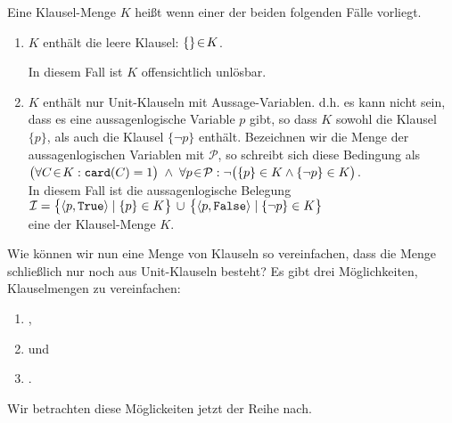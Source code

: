 \begin{Definition}
  Eine Klausel-Menge $K$ heißt  wenn einer der beiden folgenden Fälle
  vorliegt.
  \begin{enumerate}
  \item $K$ enthält die leere Klausel: \qquad $\{\} \!\in\! K$.

        In diesem Fall ist $K$ offensichtlich unlösbar.
  \item $K$ enthält nur Unit-Klauseln mit \underline{} Aussage-Variablen. d.h. es kann nicht
        sein, dass es eine aussagenlogische Variable $p$ gibt, so dass $K$ sowohl die Klausel $\{p\}$, als auch die
        Klausel $\{\neg p \}$ enthält.  Bezeichnen wir die Menge der aussagenlogischen Variablen mit $\mathcal{P}$,
        so schreibt sich diese Bedingung als 
        \\[0.3cm]
        \hspace*{1.3cm}
        $\bigl(\forall C \!\in\! K: \texttt{card}(C) = 1\bigr) \;\wedge\;
         \forall p \!\in\! \mathcal{P}: \neg\bigl( \{p\} \in K \wedge \{\neg p\} \in K\bigr)$.
        \\[0.3cm]
        In diesem Fall ist die aussagenlogische Belegung
        \\[0.2cm]
        \hspace*{1.3cm}
        $ \I = \bigl\{ \pair(p, \texttt{True}) \mid \{p\} \in K \bigr\} \,\cup\, \bigl\{
             \pair(p, \texttt{False}) \mid \{\neg p\} \in K \bigr\} 
        $
        \\[0.2cm]
        eine  der Klausel-Menge $K$. \eox
  \end{enumerate}
\end{Definition}


Wie können wir nun eine Menge von Klauseln so vereinfachen, dass die Menge schließlich nur
noch aus Unit-Klauseln besteht?  Es gibt drei
Möglichkeiten, Klauselmengen zu vereinfachen:
\begin{enumerate}
\item {},
\item {} und
\item {}.
\end{enumerate}
Wir betrachten diese Möglickeiten jetzt der Reihe nach.

